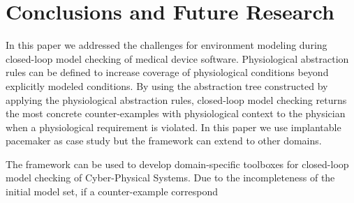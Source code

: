 \section{Conclusions and Future Research}
\label{conclusions}
In this paper we addressed the challenges for environment modeling during closed-loop model checking of medical device software. Physiological abstraction rules can be defined to increase coverage of physiological conditions beyond explicitly modeled conditions. By using the abstraction tree constructed by applying the physiological abstraction rules, closed-loop model checking returns the most concrete counter-examples with physiological context to the physician when a physiological requirement is violated. In this paper we use implantable pacemaker as case study but the framework can extend to other domains.

The framework can be used to develop domain-specific toolboxes for closed-loop model checking of Cyber-Physical Systems. Due to the incompleteness of the initial model set, if a counter-example correspond
